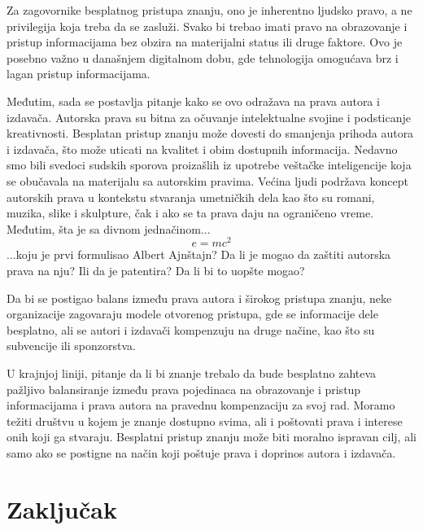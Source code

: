 \documentclass{article}
\begin{document}
Za zagovornike besplatnog pristupa znanju, ono je inherentno ljudsko pravo, a ne privilegija koja treba da se zasluži. Svako bi trebao imati pravo na obrazovanje i pristup informacijama bez obzira na materijalni status ili druge faktore. Ovo je posebno važno u današnjem digitalnom dobu, gde tehnologija omogućava brz i lagan pristup informacijama. 

Međutim, sada se postavlja pitanje kako se ovo odražava na prava autora i izdavača. Autorska prava su bitna za očuvanje intelektualne svojine i podsticanje kreativnosti. Besplatan pristup znanju može dovesti do smanjenja prihoda autora i izdavača, što može uticati na kvalitet i obim dostupnih informacija. Nedavno smo bili svedoci sudskih sporova proizašlih iz upotrebe veštačke inteligencije koja se obučavala na materijalu sa autorskim pravima. Većina ljudi podržava koncept autorskih prava u kontekstu stvaranja umetničkih dela kao što su romani, muzika, slike i skulpture, čak i ako se ta prava daju na ograničeno vreme. Međutim, šta je sa divnom jednačinom...
\begin{equation*}
e = mc^2
\end{equation*}
...koju je prvi formulisao Albert Ajnštajn? Da li je mogao da zaštiti autorska prava na nju? Ili da je patentira? Da li bi to uopšte mogao?

Da bi se postigao balans između prava autora i širokog pristupa znanju, neke organizacije zagovaraju modele otvorenog pristupa, gde se informacije dele besplatno, ali se autori i izdavači kompenzuju na druge načine, kao što su subvencije ili sponzorstva. 

U krajnjoj liniji, pitanje da li bi znanje trebalo da bude besplatno zahteva pažljivo balansiranje između prava pojedinaca na obrazovanje i pristup informacijama i prava autora na pravednu kompenzaciju za svoj rad. Moramo težiti društvu u kojem je znanje dostupno svima, ali i poštovati prava i interese onih koji ga stvaraju. Besplatni pristup znanju može biti moralno ispravan cilj, ali samo ako se postigne na način koji poštuje prava i doprinos autora i izdavača.


\section{Zaključak}
\end{document}
